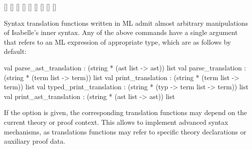 \begin{isabellebody}
\begin{isamarkuptext}
  \begin{railoutput}
\rail@bar
{}[]
[]
[]
[]
[]
\rail@endbar
\rail@bar
{}
[]
[]
[]
\rail@endbar
{}[]
\rail@end
\end{railoutput}


  Syntax translation functions written in ML admit almost arbitrary
  manipulations of Isabelle's inner syntax.  Any of the above commands
  have a single \hyperlink{syntax.text}{\mbox{}} argument that refers to an ML
  expression of appropriate type, which are as follows by default:

\begin{ttbox}
val parse_ast_translation   : (string * (ast list -> ast)) list
val parse_translation       : (string * (term list -> term)) list
val print_translation       : (string * (term list -> term)) list
val typed_print_translation : (string * (typ -> term list -> term)) list
val print_ast_translation   : (string * (ast list -> ast)) list
\end{ttbox}

  If the  option is given, the corresponding
  translation functions may depend on the current theory or proof
  context.  This allows to implement advanced syntax mechanisms, as
  translations functions may refer to specific theory declarations or
  auxiliary proof data.


\end{isamarkuptext}
\end{isabellebody}
